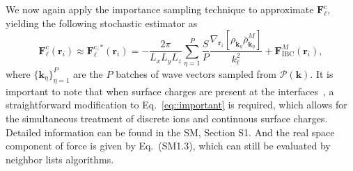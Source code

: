 We now again apply the importance sampling technique to approximate $\bm{F}_{\ell}^{\text{c}}$, yielding the following stochastic estimator as 
\begin{equation}\label{eq::important}
\bm{F}_{\ell}^{\text{c}}(\bm{r}_i)\approx \bm{F}_{\ell}^{\text{c},*}(\bm{r}_i)=-\frac{2\pi }{L_xL_yL_z}\sum_{\eta=1}^{P}\frac{S}{P}\frac{\nabla_{\bm{r}_i}\left[\rho_{\bm{k}_{\eta}}\bar{\rho}_{\bm{k}_{\eta}}^{M}\right]}{k_{\ell}^2}+\bm{F}_{\text{IBC}}^{M}(\bm{r}_i),
\end{equation}
where $\{\bm{k}_{\eta}\}_{\eta=1}^{P}$ are the $P$ batches of wave vectors sampled from $\mathscr{P}(\bm{k})$. 
It is important to note that when surface charges are present at the interfaces~\cite{spohr1997effect,yi2017note,yuan2021particle}, a straightforward modification to Eq.~\eqref{eq::important} is required, which allows for the simultaneous treatment of discrete ions and continuous surface charges.
Detailed information can be found in the SM, Section S1.
And the real space component of force is given by Eq.~(SM1.3), which can still be evaluated by neighbor lists algorithms.


